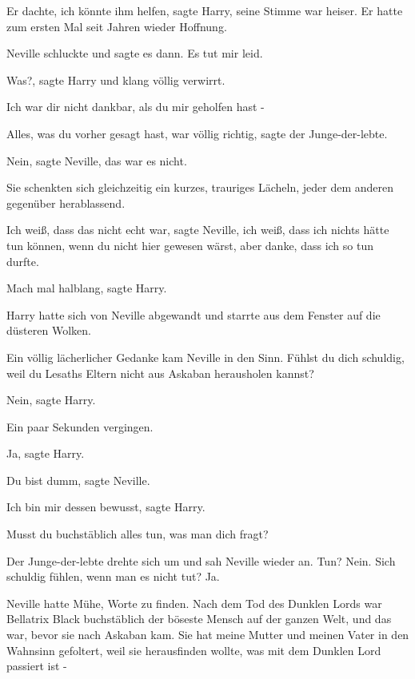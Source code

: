 \glqq{}Er dachte, ich könnte ihm helfen\grqq{}, sagte Harry, seine Stimme war
heiser. \glqq{}Er hatte zum ersten Mal seit Jahren wieder Hoffnung.\grqq{}

Neville schluckte und sagte es dann. \glqq{}Es tut mir leid.\grqq{}

\glqq{}Was?\grqq{}, sagte Harry und klang völlig verwirrt.

\glqq{}Ich war dir nicht dankbar, als du mir geholfen hast -\grqq{}

\glqq{}Alles, was du vorher gesagt hast, war völlig richtig\grqq{}, sagte der
Junge-der-lebte.

\glqq{}Nein\grqq{}, sagte Neville, \glqq{}das war es nicht.\grqq{}

Sie schenkten sich gleichzeitig ein kurzes, trauriges Lächeln, jeder dem anderen
gegenüber herablassend.

\glqq{}Ich weiß, dass das nicht echt war\grqq{}, sagte Neville, \glqq{}ich weiß,
dass ich nichts hätte tun können, wenn du nicht hier gewesen wärst, aber danke,
dass ich so tun durfte.\grqq{}

\glqq{}Mach mal halblang\grqq{}, sagte Harry.

Harry hatte sich von Neville abgewandt und starrte aus dem Fenster auf die
düsteren Wolken.

Ein völlig lächerlicher Gedanke kam Neville in den Sinn. \glqq{}Fühlst du dich
schuldig, weil du Lesaths Eltern nicht aus Askaban herausholen kannst?\grqq{}

\glqq{}Nein\grqq{}, sagte Harry.

Ein paar Sekunden vergingen.

\glqq{}Ja\grqq{}, sagte Harry.

\glqq{}Du bist dumm\grqq{}, sagte Neville.

\glqq{}Ich bin mir dessen bewusst\grqq{}, sagte Harry.

\glqq{}Musst du buchstäblich alles tun, was man dich fragt?\grqq{}

Der Junge-der-lebte drehte sich um und sah Neville wieder an. \glqq{}Tun? Nein.
Sich schuldig fühlen, wenn man es nicht tut? Ja.\grqq{}

Neville hatte Mühe, Worte zu finden. \glqq{}Nach dem Tod des Dunklen Lords war
Bellatrix Black buchstäblich der böseste Mensch auf der ganzen Welt, und das
war, bevor sie nach Askaban kam. Sie hat meine Mutter und meinen Vater in den
Wahnsinn gefoltert, weil sie herausfinden wollte, was mit dem Dunklen Lord
passiert ist -\grqq{}

